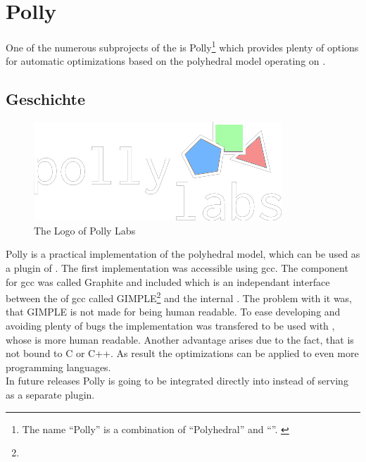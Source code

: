 \chapter{Polly}
One of the numerous subprojects of the \llvm is Polly\footnote{The name \enquote{Polly} is a combination of \enquote{Polyhedral} and \enquote{\llvm}. \cite{PollyGrosser}} which provides plenty of options for automatic optimizations based on the polyhedral model operating on \llvmir.

\section{Geschichte}
\begin{figure}
    \caption[The logo of Polly Labs]{The Logo of Polly Labs \cite{PollyLabsLogo}}
    \includegraphics[width=.5\textwidth]{gfx/pollylabs.png}
\end{figure}
Polly is a practical implementation of the polyhedral model, which can be used as a plugin of \llvm.
The first implementation was accessible using gcc.
The component for gcc was called Graphite and included \pcp which is an independant interface between the \ir of gcc called GIMPLE\footnote{} and the internal \ir \gpoly . \cite{GrosserGraphite, gccGimple, gccGraphite} 
The problem with it was, that GIMPLE is not made for being human readable.
To ease developing and avoiding plenty of bugs the implementation was transfered to be used with \llvm, whose \ir is more human readable.
Another advantage arises due to the fact, that \llvm is not bound to C or C++.
As result the optimizations can be applied to even more programming languages. \\
In future releases Polly is going to be integrated directly into \llvm instead of serving as a separate plugin.

